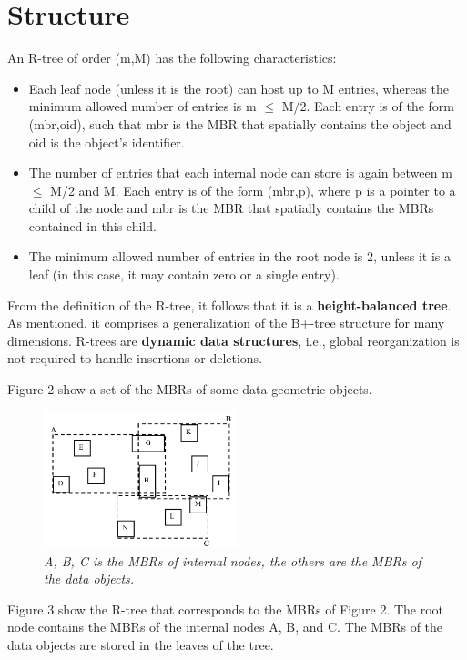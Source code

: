 \documentclass{article}
\begin{document}
\section{Structure}

An R-tree of order (m,M) has the following characteristics:
\begin{itemize}
    \item Each leaf node (unless it is the root) can host up to M entries, whereas the minimum allowed number of entries is m $\leq$  M/2. Each entry is of the form (mbr,oid), such that mbr is the MBR that spatially contains the object and oid is the object’s identifier.
    \item The number of entries that each internal node can store is again between m $\leq$ M/2 and M. Each entry is of the form (mbr,p), where p is a pointer to a child of the node and mbr is the MBR that spatially contains the MBRs contained in this child.
    \item The minimum allowed number of entries in the root node is 2, unless it is a leaf (in this case, it may contain zero or a single entry).
\end{itemize}

From the definition of the R-tree, it follows that it is a \textbf{height-balanced tree}.
As mentioned, it comprises a generalization of the B+-tree structure for many
dimensions. R-trees are \textbf{dynamic data structures}, i.e., global reorganization is
not required to handle insertions or deletions.

Figure 2 show a set of the MBRs of some data geometric objects.\par

\begin{figure}[h]
\centering
\includegraphics[width=0.5\textwidth]{1.2.png}
\caption{\textit{A, B, C is the MBRs of internal nodes, the others are the MBRs of the data objects.}}
\label{fig:1.2}
\end{figure}

Figure 3 show the R-tree that corresponds to the MBRs of Figure 2. The root node contains the MBRs of the internal nodes A, B, and C. The MBRs of the data objects are stored in the leaves of the tree. 
\end{document}
